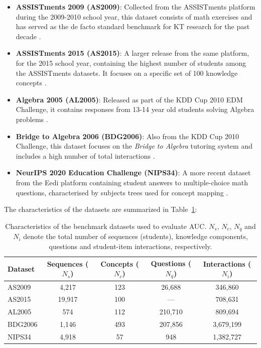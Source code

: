 \documentclass[applsci,article,submit,moreauthors,pdftex]{Definitions/mdpi}
\begin{document}
\begin{itemize}
    \item \textbf{ASSISTments 2009 (AS2009)}: Collected from the ASSISTments platform during the 2009-2010 school year, this dataset consists of math exercises and has served as the de facto standard benchmark for KT research for the past decade \citep{feng2009addressing}.
    \item \textbf{ASSISTments 2015 (AS2015)}: A larger release from the same platform, for the 2015 school year, containing the highest number of students among the ASSISTments datasets. It focuses on a specific set of 100 knowledge concepts \citep{feng2009addressing}.
    \item \textbf{Algebra 2005 (AL2005)}: Released as part of the KDD Cup 2010 EDM Challenge, it contains responses from 13-14 year old students solving Algebra problems \citep{stamper2010algebra}.
    \item \textbf{Bridge to Algebra 2006 (BDG2006)}: Also from the KDD Cup 2010 Challenge, this dataset focuses on the \textit{Bridge to Algebra} tutoring system and includes a high number of total interactions \citep{stamper2010algebra}.
    \item \textbf{NeurIPS 2020 Education Challenge (NIPS34)}: A more recent dataset from the Eedi platform containing student answers to multiple-choice math questions, characterised by subjects trees used for concept mapping \citep{wang2020instructions}.
\end{itemize}

The characteristics of the datasets are summarized in Table~\ref{tab_datasets}: 

\begin{table}[htbp]
\centering
\begin{tabularx}{\textwidth}{lcccc}
\toprule
\textbf{Dataset} & \textbf{Sequences ($N_s$)} & \textbf{Concepts ($N_c$)} & \textbf{Questions ($N_q$)} & \textbf{Interactions ($N_i$)} \\
\midrule
AS2009 & 4,217 & 123 & 26,688 & 346,860 \\
AS2015 & 19,917 & 100 & --- & 708,631 \\
AL2005 & 574 & 112 & 210,710 & 809,694 \\
BDG2006 & 1,146 & 493 & 207,856 & 3,679,199 \\
NIPS34 & 4,918 & 57 & 948 & 1,382,727 \\
\bottomrule
\end{tabularx}
\caption{Characteristics of the benchmark datasets used to evaluate AUC. $N_s$, $N_c$, $N_q$ and $N_i$ denote the total number of sequences (students), knowledge components, questions and student-item interactions, respectively. \label{tab_datasets}}
\end{table}
\end{document}

